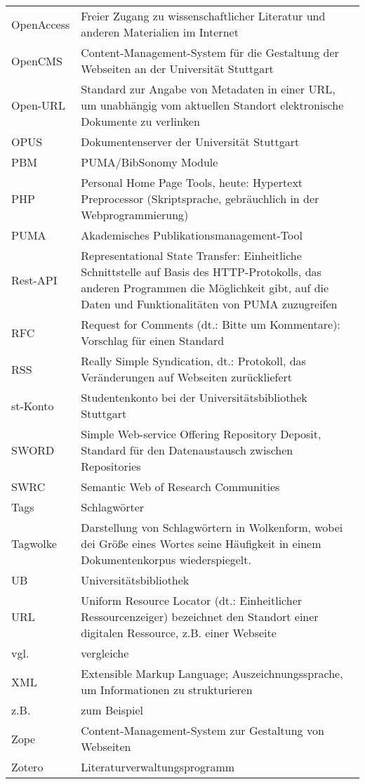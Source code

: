 \begin{longtable}{l p{8cm}}
OpenAccess  &Freier Zugang zu wissenschaftlicher Literatur und anderen Materialien im Internet\\
OpenCMS &  Content-Management-System für die Gestaltung der Webseiten an der Universität Stuttgart\\
Open-URL & Standard zur Angabe von Metadaten in einer URL, um unabhängig vom aktuellen Standort elektronische Dokumente zu verlinken\\
OPUS&Dokumentenserver der Universität Stuttgart\\
PBM&PUMA/BibSonomy Module\\
PHP&Personal Home Page Tools, heute: Hypertext Preprocessor (Skriptsprache, gebräuchlich in der Webprogrammierung)\\
PUMA & Akademisches Publikationsmanagement-Tool\\
Rest-API&Representational State Transfer: Einheitliche Schnittstelle auf Basis des HTTP-Protokolls, das anderen Programmen die Möglichkeit gibt, auf die Daten und Funktionalitäten von PUMA zuzugreifen\\
RFC&   Request for Comments (dt.: Bitte um Kommentare): Vorschlag für einen Standard\\
RSS&Really Simple Syndication, dt.: Protokoll, das Veränderungen auf Webseiten zurückliefert\\
st-Konto&  Studentenkonto bei der Universitätsbibliothek Stuttgart\\
SWORD&Simple Web-service Offering Repository Deposit, Standard für den Datenaustausch zwischen Repositories\\
SWRC&Semantic Web of Research Communities\\
Tags&Schlagwörter\\
Tagwolke& Darstellung von Schlagwörtern in Wolkenform, wobei dei Größe eines Wortes seine Häufigkeit in einem Dokumentenkorpus wiederspiegelt.\\
UB&Universitätsbibliothek\\
URL &Uniform Resource Locator (dt.: Einheitlicher Ressourcenzeiger) bezeichnet den Standort einer digitalen Ressource, z.B. einer Webseite\\
vgl.&vergleiche\\
XML&Extensible Markup Language; Auszeichnungssprache, um Informationen zu strukturieren\\
z.B.&zum Beispiel\\
Zope&Content-Management-System zur Gestaltung von Webseiten\\
Zotero & Literaturverwaltungsprogramm\\
\end{longtable}
